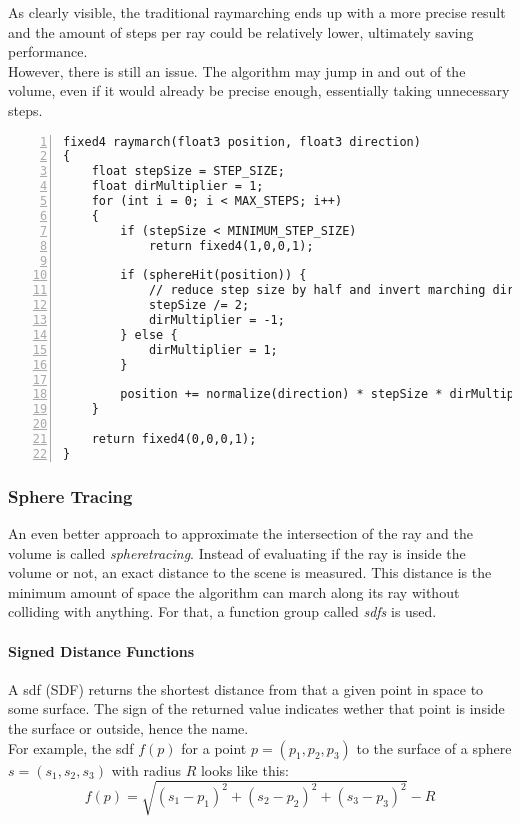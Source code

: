 \noindent
As clearly visible, the traditional \gls{raymarching} ends up with a more precise result and the amount of steps per ray could be relatively lower, ultimately saving performance. 
\\
However, there is still an issue. The algorithm may jump in and out of the volume, even if it would already be precise enough, essentially taking unnecessary steps.

\begin{lstlisting}[language=HLSL, numbers=left, caption=Implementation of a traditional ray march function with converging surface distance approximation.,captionpos=b, label=lst:shader:raymarch:traditional]
fixed4 raymarch(float3 position, float3 direction)
{
    float stepSize = STEP_SIZE;
    float dirMultiplier = 1;
    for (int i = 0; i < MAX_STEPS; i++)
    {
        if (stepSize < MINIMUM_STEP_SIZE)
            return fixed4(1,0,0,1);

        if (sphereHit(position)) {
            // reduce step size by half and invert marching direction.
            stepSize /= 2;
            dirMultiplier = -1;
        } else {
            dirMultiplier = 1;
        }
        
        position += normalize(direction) * stepSize * dirMultiplier;
    }
    
    return fixed4(0,0,0,1);
}
\end{lstlisting}

\pagebreak
\subsubsection{Sphere Tracing}
An even better approach to approximate the intersection of the ray and the volume is called \textit{\gls{spheretracing}}. 
Instead of evaluating if the ray is inside the volume or not, an exact distance to the scene is measured. This distance is the minimum amount of space the algorithm can march along its ray without colliding with anything.
For that, a function group called \textit{\gls{sdf}s} is used.

\paragraph{Signed Distance Functions}
A \gls{sdf} (SDF) returns the shortest distance from that a given point in space to some surface.
The sign of the returned value indicates wether that point is inside the surface or outside, hence the name.
\\
For example, the \gls{sdf} $f(p)$ for a point $p=(p_1, p_2, p_3)$ to the surface of a sphere $s=(s_1, s_2, s_3)$ with radius $R$ looks like this:
$$ f(p) = \sqrt{(s_1 - p_1)^2 + (s_2 - p_2)^2 + (s_3 - p_3)^2} - R $$

